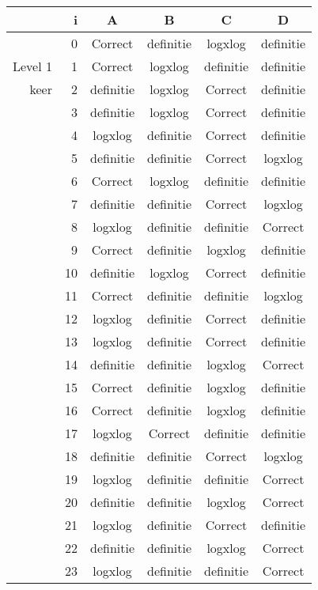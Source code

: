 \begin{tabular}{ rr| c|c|c|c}\hline\hline
     & i & \textbf{A} & \textbf{B} & \textbf{C} & \textbf{D}\\\hline

&0&Correct\cellcolor[gray]{0.6}&definitie&logxlog&definitie\\
Level 1 & 1&Correct\cellcolor[gray]{0.6}&logxlog&definitie&definitie\\
keer &2&definitie&logxlog&Correct\cellcolor[gray]{0.6}&definitie\\
&3&definitie&logxlog&Correct\cellcolor[gray]{0.6}&definitie\\
&4&logxlog&definitie&Correct\cellcolor[gray]{0.6}&definitie\\
&5&definitie&definitie&Correct\cellcolor[gray]{0.6}&logxlog\\
&6&Correct\cellcolor[gray]{0.6}&logxlog&definitie&definitie\\
&7&definitie&definitie&Correct\cellcolor[gray]{0.6}&logxlog\\
&8&logxlog&definitie&definitie&Correct\cellcolor[gray]{0.6}\\
&9&Correct\cellcolor[gray]{0.6}&definitie&logxlog&definitie\\
&10&definitie&logxlog&Correct\cellcolor[gray]{0.6}&definitie\\
&11&Correct\cellcolor[gray]{0.6}&definitie&definitie&logxlog\\
&12&logxlog&definitie&Correct\cellcolor[gray]{0.6}&definitie\\
&13&logxlog&definitie&Correct\cellcolor[gray]{0.6}&definitie\\
&14&definitie&definitie&logxlog&Correct\cellcolor[gray]{0.6}\\
&15&Correct\cellcolor[gray]{0.6}&definitie&logxlog&definitie\\
&16&Correct\cellcolor[gray]{0.6}&definitie&logxlog&definitie\\
&17&logxlog&Correct\cellcolor[gray]{0.6}&definitie&definitie\\
&18&definitie&definitie&Correct\cellcolor[gray]{0.6}&logxlog\\
&19&logxlog&definitie&definitie&Correct\cellcolor[gray]{0.6}\\
&20&definitie&definitie&logxlog&Correct\cellcolor[gray]{0.6}\\
&21&logxlog&definitie&Correct\cellcolor[gray]{0.6}&definitie\\
&22&definitie&definitie&logxlog&Correct\cellcolor[gray]{0.6}\\
&23&logxlog&definitie&definitie&Correct\cellcolor[gray]{0.6}\\
\hline\end{tabular}\par\ \newline

